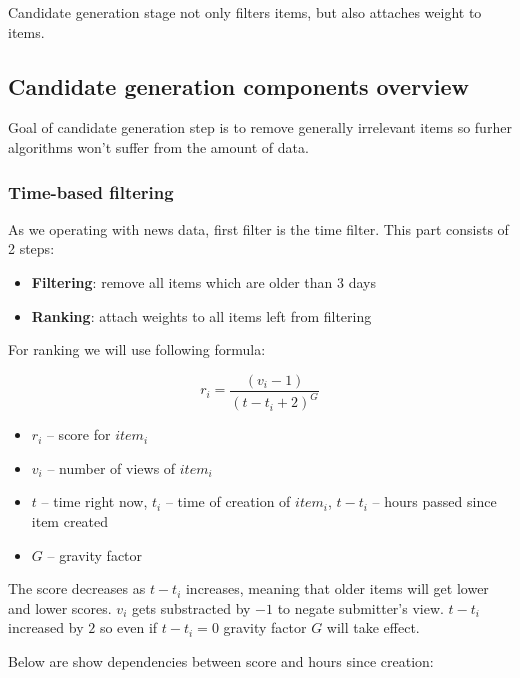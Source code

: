 \documentclass{article}
\begin{document}
Candidate generation stage not only filters items, but also attaches weight to items.

\subsection{Candidate generation components overview}

Goal of candidate generation step is to remove generally irrelevant items so furher algorithms won't suffer from the amount of data.

\subsubsection{Time-based filtering}

As we operating with news data, first filter is the time filter. This part consists of 2 steps:

\begin{itemize}
    \item \textbf{Filtering}: remove all items which are older than 3 days
    \item \textbf{Ranking}: attach weights to all items left from filtering
\end{itemize}

For ranking we will use following formula:

$$r_i = \frac{(v_i - 1)}{(t - t_i + 2)^G}$$


\begin{itemize}
    \item $r_i$ -- score for $item_i$
    \item $v_i$ -- number of views of $item_i$
    \item $t$ -- time right now, $t_i$ -- time of creation of $item_i$, $t - t_i$ -- hours passed since item created
    \item $G$ -- gravity factor
\end{itemize}

The score decreases as $t - t_i$ increases, meaning that older items will get lower and lower scores. $v_i$ gets substracted by $-1$ to negate submitter's view. $t - t_i$ increased by $2$ so even if $t - t_i = 0$ gravity factor $G$ will take effect.


Below are show dependencies between score and hours since creation:
\end{document}

